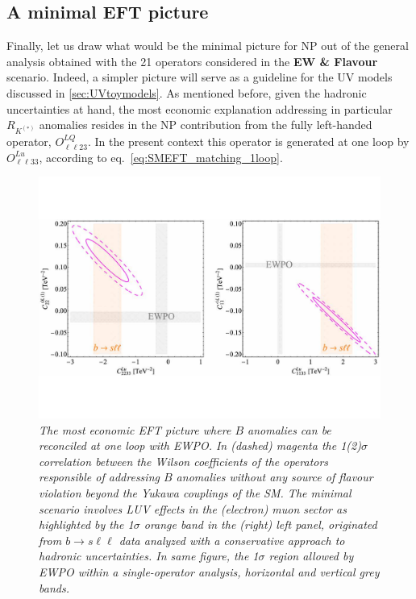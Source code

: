 \subsection{A minimal EFT picture}
Finally, let us draw what would be the minimal picture for NP out of the general analysis obtained with the 21 operators considered in the {\bf EW \& Flavour} scenario. Indeed, a simpler picture will serve as a guideline for the UV models discussed in \autoref{sec:UVtoymodels}. 
As mentioned before, given the hadronic uncertainties at hand, the most economic explanation addressing in particular $R_{K^{(*)}}$ anomalies resides in the NP contribution from the fully left-handed operator, $O^{LQ}_{\ell \ell 2 3}$. In the present context this operator is generated at one loop by $O^{Lu}_{\ell \ell 3 3}$, according to eq.~\eqref{eq:SMEFT_matching_1loop}.

\begin{figure}[htpb!]
	\includegraphics[width=\textwidth]{figures/CHL_CLu.pdf}
	\caption{\it The most economic EFT picture where $B$ anomalies can be reconciled at one loop with EWPO. In (dashed) magenta the 1(2)$\sigma$ correlation between the Wilson coefficients of the operators responsible of addressing $B$ anomalies without any source of flavour violation beyond the Yukawa couplings of the SM. The minimal scenario involves LUV effects in the (electron) muon sector as highlighted by the 1$\sigma$ orange band in the (right) left panel, originated from $b \to s \ell \ell$ data analyzed with a conservative approach to hadronic uncertainties. In same figure, the 1$\sigma$ region allowed by EWPO within a single-operator analysis, horizontal and vertical grey bands.}    
	\label{fig:2D_correlations}
\end{figure}

